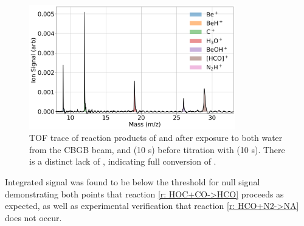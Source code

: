 \begin{figure}[H]
	\centering
	\includegraphics[width=0.8\textwidth]{images/C_H2O_CO_15N2.png}
	\caption{TOF trace of reaction products of  and  after exposure to both water from the CBGB beam, and  (10 s) before titration with  (10 s). There is a distinct lack of , indicating full conversion of .}
	\label{fig: CO N2 TOF}
\end{figure}

Integrated  signal was found to be below the threshold for null signal demonstrating both points that reaction \ref{r: HOC+CO->HCO} proceeds as expected, as well as experimental verification that reaction \ref{r: HCO+N2->NA} does not occur.